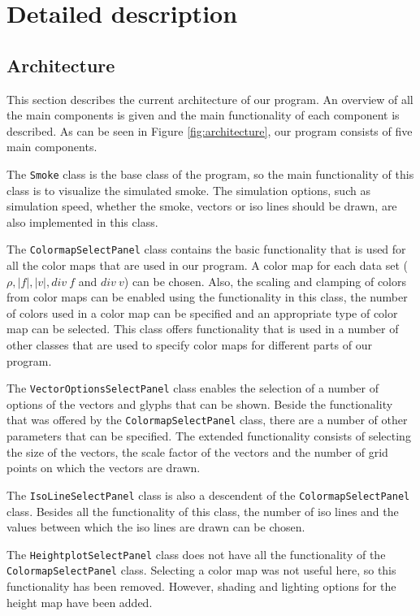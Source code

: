 \documentclass[a4paper,11pt,twoside]{report}
\begin{document}
\chapter{Detailed description}\label{detaileddescription}
    \section{Architecture}
        This section describes the current architecture of our program. An overview of all the main components is given and the main functionality of each component is described. As can be seen in Figure \ref{fig:architecture}, our program consists of five main components.

        The \texttt{Smoke} class is the base class of the program, so the main functionality of this class is to visualize the simulated smoke. The simulation options, such as simulation speed, whether the smoke, vectors or iso lines should be drawn, are also implemented in this class.

        The \texttt{ColormapSelectPanel} class contains the basic functionality that is used for all the color maps that are used in our program. A color map for each data set ($\rho, |f|, |v|, div~f$ and $div~v$) can be chosen. Also, the scaling and clamping of colors from color maps can be enabled using the functionality in this class, the number of colors used in a color map can be specified and an appropriate type of color map can be selected. This class offers functionality that is used in a number of other classes that are used to specify color maps for different parts of our program.

        The \texttt{VectorOptionsSelectPanel} class enables the selection of a number of options of the vectors and glyphs that can be shown. Beside the functionality that was offered by the \texttt{ColormapSelectPanel} class, there are a number of other parameters that can be specified. The extended functionality consists of selecting the size of the vectors, the scale factor of the vectors and the number of grid points on which the vectors are drawn.

        The \texttt{IsoLineSelectPanel} class is also a descendent of the \texttt{ColormapSelectPanel} class. Besides all the functionality of this class, the number of iso lines and the values between which the iso lines are drawn can be chosen.

        The \texttt{HeightplotSelectPanel} class does not have all the functionality of the \texttt{ColormapSelectPanel} class. Selecting a color map was not useful here, so this functionality has been removed. However, shading and lighting options for the height map have been added.
\end{document}
